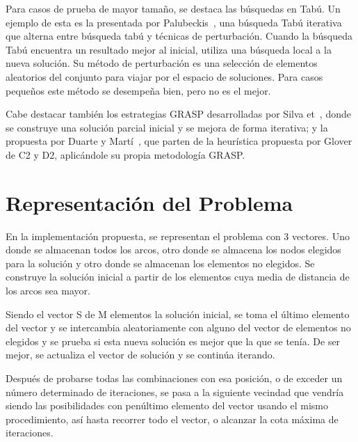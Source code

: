 \documentclass{ci5652}
\begin{document}
Para casos de prueba de mayor tamaño, se destaca las búsquedas en Tabú. Un ejemplo de esta es la presentada por Palubeckis~\cite{palubeckis}, una búsqueda Tabú iterativa que alterna entre búsqueda tabú y técnicas de perturbación. Cuando la búsqueda Tabú encuentra un resultado mejor al inicial, utiliza una búsqueda local a la nueva solución. Su método de perturbación es una selección de elementos aleatorios del conjunto para viajar por el espacio de soluciones. Para casos pequeños este método se desempeña bien, pero no es el mejor.

Cabe destacar también los estrategias GRASP desarrolladas por Silva et~\cite{silva}, donde se construye una solución parcial inicial y se mejora de forma iterativa; y la propuesta por Duarte y Martí~\cite{duarmar}, que parten de la heurística propuesta por Glover de C2 y D2, aplicándole su propia metodología GRASP.

\section{Representación del Problema}
En la implementación propuesta, se representan el problema con 3 vectores. Uno donde se almacenan todos los arcos, otro donde se almacena los nodos elegidos para la solución y otro donde se almacenan los elementos no elegidos. Se construye la solución inicial a partir de los elementos cuya media de distancia de los arcos sea mayor.

Siendo el vector S de M elementos la solución inicial, se toma el último elemento del vector y se intercambia aleatoriamente con alguno del vector de elementos no elegidos y se prueba si esta nueva solución es mejor que la que se tenía. De ser mejor, se actualiza el vector de solución y se continúa iterando.

Después de probarse todas las combinaciones con esa posición, o de exceder un número determinado de iteraciones, se pasa a la siguiente vecindad que vendría siendo las posibilidades con penúltimo elemento del vector usando el mismo procedimiento, así hasta recorrer todo el vector, o alcanzar la cota máxima de iteraciones.
\end{document}
